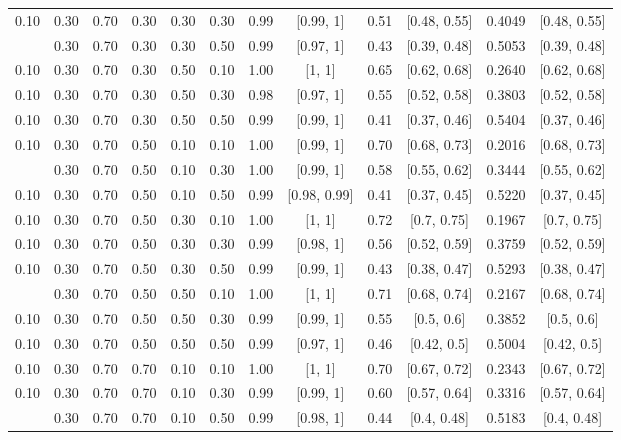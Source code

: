 \documentclass[
  11pt,
]{article}
\begin{document}
\begin{landscape}
\begin{ThreePartTable}
\begin{longtable}[t]{cccccccccccc}
0.10 & 0.30 & 0.70 & 0.30 & 0.30 & 0.30 & 0.99 & {}[0.99, 1] & 0.51 & {}[0.48, 0.55] & 0.4049 & {}[0.48, 0.55]\\
\addlinespace
0.10 & 0.30 & 0.70 & 0.30 & 0.30 & 0.50 & 0.99 & {}[0.97, 1] & 0.43 & {}[0.39, 0.48] & 0.5053 & {}[0.39, 0.48]\\
0.10 & 0.30 & 0.70 & 0.30 & 0.50 & 0.10 & 1.00 & {}[1, 1] & 0.65 & {}[0.62, 0.68] & 0.2640 & {}[0.62, 0.68]\\
0.10 & 0.30 & 0.70 & 0.30 & 0.50 & 0.30 & 0.98 & {}[0.97, 1] & 0.55 & {}[0.52, 0.58] & 0.3803 & {}[0.52, 0.58]\\
0.10 & 0.30 & 0.70 & 0.30 & 0.50 & 0.50 & 0.99 & {}[0.99, 1] & 0.41 & {}[0.37, 0.46] & 0.5404 & {}[0.37, 0.46]\\
0.10 & 0.30 & 0.70 & 0.50 & 0.10 & 0.10 & 1.00 & {}[0.99, 1] & 0.70 & {}[0.68, 0.73] & 0.2016 & {}[0.68, 0.73]\\
\addlinespace
0.10 & 0.30 & 0.70 & 0.50 & 0.10 & 0.30 & 1.00 & {}[0.99, 1] & 0.58 & {}[0.55, 0.62] & 0.3444 & {}[0.55, 0.62]\\
0.10 & 0.30 & 0.70 & 0.50 & 0.10 & 0.50 & 0.99 & {}[0.98, 0.99] & 0.41 & {}[0.37, 0.45] & 0.5220 & {}[0.37, 0.45]\\
0.10 & 0.30 & 0.70 & 0.50 & 0.30 & 0.10 & 1.00 & {}[1, 1] & 0.72 & {}[0.7, 0.75] & 0.1967 & {}[0.7, 0.75]\\
0.10 & 0.30 & 0.70 & 0.50 & 0.30 & 0.30 & 0.99 & {}[0.98, 1] & 0.56 & {}[0.52, 0.59] & 0.3759 & {}[0.52, 0.59]\\
0.10 & 0.30 & 0.70 & 0.50 & 0.30 & 0.50 & 0.99 & {}[0.99, 1] & 0.43 & {}[0.38, 0.47] & 0.5293 & {}[0.38, 0.47]\\
\addlinespace
0.10 & 0.30 & 0.70 & 0.50 & 0.50 & 0.10 & 1.00 & {}[1, 1] & 0.71 & {}[0.68, 0.74] & 0.2167 & {}[0.68, 0.74]\\
0.10 & 0.30 & 0.70 & 0.50 & 0.50 & 0.30 & 0.99 & {}[0.99, 1] & 0.55 & {}[0.5, 0.6] & 0.3852 & {}[0.5, 0.6]\\
0.10 & 0.30 & 0.70 & 0.50 & 0.50 & 0.50 & 0.99 & {}[0.97, 1] & 0.46 & {}[0.42, 0.5] & 0.5004 & {}[0.42, 0.5]\\
0.10 & 0.30 & 0.70 & 0.70 & 0.10 & 0.10 & 1.00 & {}[1, 1] & 0.70 & {}[0.67, 0.72] & 0.2343 & {}[0.67, 0.72]\\
0.10 & 0.30 & 0.70 & 0.70 & 0.10 & 0.30 & 0.99 & {}[0.99, 1] & 0.60 & {}[0.57, 0.64] & 0.3316 & {}[0.57, 0.64]\\
\addlinespace
0.10 & 0.30 & 0.70 & 0.70 & 0.10 & 0.50 & 0.99 & {}[0.98, 1] & 0.44 & {}[0.4, 0.48] & 0.5183 & {}[0.4, 0.48]\\

\end{longtable}
\end{ThreePartTable}
\end{landscape}
\end{document}

